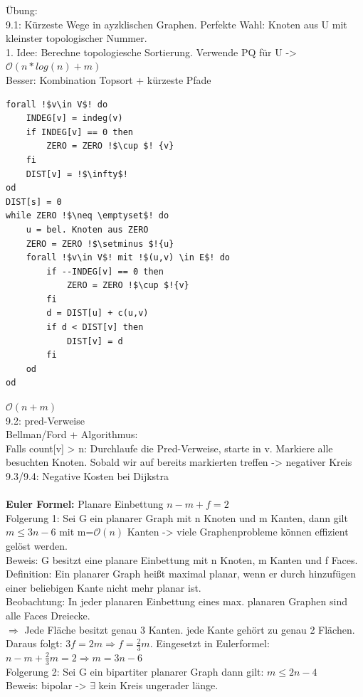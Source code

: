 \documentclass[a4paper]{article}
\newcommand{\oh}[1]{$\mathcal{O}(#1)$}
\begin{document}
Übung:\\
9.1: Kürzeste Wege in ayzklischen Graphen. Perfekte Wahl: Knoten aus U mit kleinster topologischer Nummer.\\
1. Idee: Berechne topologiesche Sortierung. Verwende PQ für U -> \oh{n*log(n)+m}\\
Besser: Kombination Topsort + kürzeste Pfade
\begin{lstlisting}[escapechar=!]
forall !$v\in V$! do
	INDEG[v] = indeg(v)
	if INDEG[v] == 0 then
		ZERO = ZERO !$\cup $! {v}
	fi
	DIST[v] = !$\infty$!
od
DIST[s] = 0
while ZERO !$\neq \emptyset$! do
	u = bel. Knoten aus ZERO
	ZERO = ZERO !$\setminus $!{u}
	forall !$v\in V$! mit !$(u,v) \in E$! do
		if --INDEG[v] == 0 then
			ZERO = ZERO !$\cup $!{v}
		fi
		d = DIST[u] + c(u,v)
		if d < DIST[v] then
			DIST[v] = d
		fi
	od
od
\end{lstlisting}
\oh{n+m}\\
9.2: pred-Verweise\\
Bellman/Ford + Algorithmus:\\
Falls count[v] > n: Durchlaufe die Pred-Verweise, starte in v. Markiere alle besuchten Knoten. Sobald wir auf bereits markierten treffen -> negativer Kreis\\
9.3/9.4: Negative Kosten bei Dijkstra\\
\hspace*{1cm}\\
\textbf{Euler Formel:} Planare Einbettung $n-m+f=2$\\
Folgerung 1: Sei G ein planarer Graph mit n Knoten und m Kanten, dann gilt $m\leq 3n-6$ mit m=\oh{n} Kanten -> viele Graphenprobleme können effizient gelöst werden.\\
Beweis: G besitzt eine planare Einbettung mit n Knoten, m Kanten und f Faces.\\
Definition: Ein planarer Graph heißt maximal planar, wenn er durch hinzufügen einer beliebigen Kante nicht mehr planar ist.\\
Beobachtung: In jeder planaren Einbettung eines max. planaren Graphen sind alle Faces Dreiecke.\\
$\Rightarrow$ Jede Fläche besitzt genau 3 Kanten. jede Kante gehört zu genau 2 Flächen.\\
Daraus folgt: $3f=2m \Rightarrow f=\frac{2}{3}m$. Eingesetzt in Eulerformel: $n-m+\frac{2}{3}m=2 \Rightarrow m=3n-6$\\
Folgerung 2: Sei G ein bipartiter planarer Graph dann gilt: $m\leq 2n-4$\\
Beweis: bipolar -> $\exists$ kein Kreis ungerader länge.\\
\end{document}
